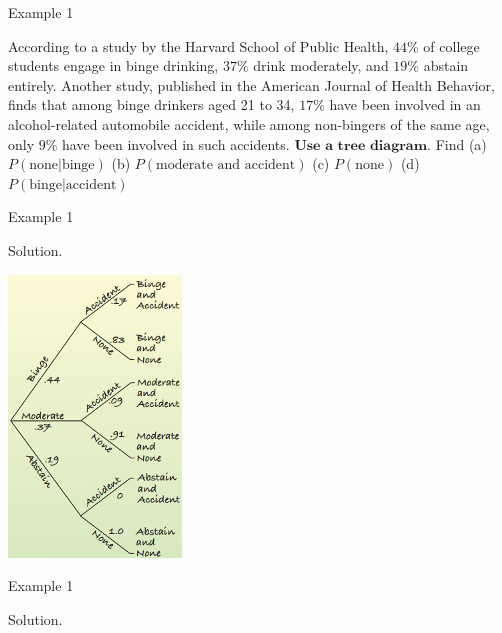 \documentclass[
  ignorenonframetext,
]{beamer}
\begin{document}
\begin{frame}{Example 1}
\protect\hypertarget{example-1-1}{}
\begin{tcolorbox}

According to a study by the Harvard School of Public Health, $44\%$ of college students engage in binge drinking, $37\%$ drink moderately, and $19\%$ abstain entirely. Another study, published in the American Journal of Health Behavior, finds that among binge drinkers aged 21 to 34, $17\%$ have been involved in an alcohol-related automobile accident, while among non-bingers of the same age, only $9\%$ have been involved in such accidents. $\textbf{Use a tree diagram}$. Find (a) $P(\text{none|binge})$ (b) $P(\text{moderate and accident})$ (c) $P(\text{none})$
(d) $P(\text{binge|accident})$
\end{tcolorbox}
\end{frame}

\begin{frame}{Example 1}
\protect\hypertarget{example-1-2}{}
\begin{tcolorbox}
Solution. 


\begin{center}\includegraphics[width=0.3\linewidth,height=0.5\textheight]{week8_7} \end{center}


\vspace{30mm}

\end{tcolorbox}
\end{frame}

\begin{frame}{Example 1}
\protect\hypertarget{example-1-3}{}
\begin{tcolorbox}
Solution. 

\vspace{50mm}

\end{tcolorbox}
\end{frame}
\end{document}
